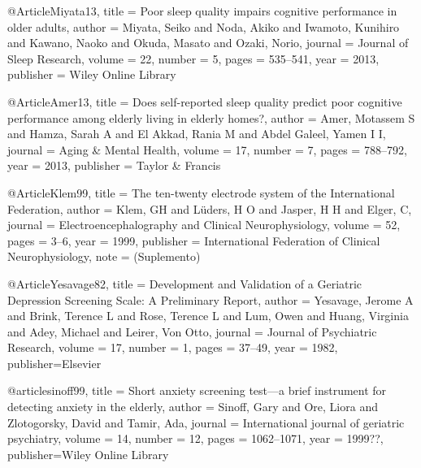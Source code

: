@Article{Miyata13,
    title   = {Poor sleep quality impairs cognitive performance in older adults},
    author  = {Miyata, Seiko 
               and Noda, Akiko 
               and Iwamoto, Kunihiro 
               and Kawano, Naoko 
               and Okuda, Masato 
               and Ozaki, Norio},
    journal = {Journal of {S}leep {R}esearch},
    volume  = {22},
    number  = {5},
    pages   = {535--541},
    year    = {2013},
    publisher = {Wiley Online Library}
}

@Article{Amer13,
    title   = {Does self-reported sleep quality predict poor cognitive performance among elderly 
               living in elderly homes?},
    author  = {Amer, Motassem S 
               and Hamza, Sarah A 
               and El Akkad, Rania M 
               and Abdel Galeel, Yamen I I},
    journal = {Aging \& {M}ental {H}ealth},
    volume  = {17},
    number  = {7},
    pages   = {788--792},
    year    = {2013},
    publisher = {Taylor \& Francis}
}

@Article{Klem99,
    title   = {The ten-twenty electrode system of the {I}nternational {F}ederation},
    author  = {Klem, GH and L{\"u}ders, H O and Jasper, H H and Elger, C},
    journal = {Electroencephalography and {C}linical {N}europhysiology},
    volume  = {52},
    pages   = {3--6},
    year    = {1999},
    publisher = {International {F}ederation of {C}linical {N}europhysiology},
    note    = {(Suplemento)}
}

@Article{Yesavage82,
    title   = {Development and {V}alidation of a {G}eriatric {D}epression {S}creening {S}cale: {A} 
               {P}reliminary {R}eport},
    author  = {Yesavage, Jerome A 
               and Brink, Terence L 
               and Rose, Terence L 
               and Lum, Owen 
               and Huang, Virginia 
               and Adey, Michael 
               and Leirer, Von Otto},
    journal = {Journal of {P}sychiatric {R}esearch},
    volume  = {17},
    number  = {1},
    pages   = {37--49},
    year    = {1982},
    publisher={Elsevier}
}

@article{sinoff99,
    title   = {Short anxiety screening test—a brief instrument for detecting anxiety in the 
               elderly},
    author  = {Sinoff, Gary 
               and Ore, Liora 
               and Zlotogorsky, David 
               and Tamir, Ada},
    journal = {International journal of geriatric psychiatry},
    volume  = {14},
    number  = {12},
    pages   = {1062--1071},
    year    = {1999??},
    publisher={Wiley Online Library}
}


